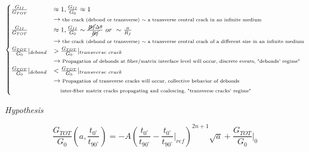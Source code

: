 \documentclass[a4paper]{jpconf}
\begin{document}
\begin{equation}
\begin{cases}
\frac{G_{II}}{G_{TOT}}&\approx 1, \frac{G_{II}}{G_{0}}\approx 1\\ &\rightarrow\text{\scriptsize the crack (debond or transverse) $\sim$ a transverse central crack in an infinite medium}\\
\frac{G_{II}}{G_{TOT}}&\approx 1, \frac{G_{II}}{G_{0}}\sim\frac{\cancel{R_{f}}\Delta\theta}{\cancel{R_{f}}}\ or\  \sim\frac{a}{R_{f}}\\ &\rightarrow\text{\scriptsize the crack (debond or transverse) $\sim$ a transverse central crack of a different size in an infinite medium}\\
\frac{G_{TOT}}{G_{0}}|_{debond}&>\frac{G_{TOT}}{G_{0}}|_{transverse\ crack}\\ &\rightarrow\text{\scriptsize Propagation of debonds at fiber/matrix interface level will occur, discrete events, "debonds' regime"}\\
\frac{G_{TOT}}{G_{0}}|_{debond}&<\frac{G_{TOT}}{G_{0}}|_{transverse\ crack}\\ &\rightarrow\text{\scriptsize Propagation of transverse cracks will occur, collective behavior of debonds}\\
&\quad\text{\scriptsize inter-fiber matrix cracks propagating and coalescing, "transverse cracks' regime"}\\
\end{cases}
\end{equation}

\em{Hypothesis}

\begin{equation}
\frac{G_{TOT}}{G_{0}}\left(a,\frac{t_{0^{\circ}}}{t_{90^{\circ}}}\right)=-A\left(\frac{t_{0^{\circ}}}{t_{90^{\circ}}}-\frac{t_{0^{\circ}}}{t_{90^{\circ}}}|_{ref}\right)^{2n+1}\sqrt{a}+\frac{G_{TOT}}{G_{0}}|_{0}
\end{equation}





\end{document}
